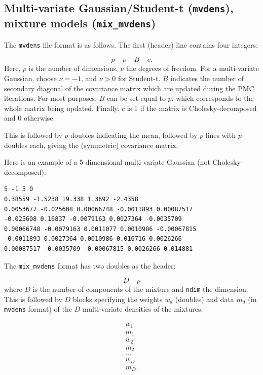\documentclass[11pt, chapterprefix, headsepline]{scrartcl}
\begin{document}
\begin{appendix}
\subsection{Multi-variate Gaussian/Student-t (\texttt{mvdens}),
  mixture models (\texttt{mix\_mvdens})}
\label{sec:mvdens}

The \texttt{mvdens} file format is as follows. The first (header) line
contains four integers:

$$
   p \;\;\;\; \nu \;\;\;\; B \;\;\;\; c.
$$
%
Here, $p$ is the number of dimensions, $\nu$ the
degrees of freedom. For a multi-variate Gaussian, choose
$\nu=-1$, and $\nu>0$ for Student-t. $B$
indicates the number of secondary diagonal of the covariance matrix
which are updated during the PMC iterations. For most purposes,
$B$ can be set equal to $p$, which
corresponds to the whole matrix being updated. Finally, $c$
is 1 if the matrix is Cholesky-decomposed and 0 otherwise.

This is followed by $p$ doubles indicating the mean,
followed by $p$ lines with $p$ doubles each,
giving the (symmetric) covariance matrix.

Here is an example of a $5$-dimensional multi-variate Gaussian (not Cholesky-decomposed):

\begin{verbatim}
5 -1 5 0
0.38559 -1.5238 19.338 1.3692 -2.4358 
0.0053677 -0.025608 0.00066748 -0.0011893 0.00087517 
-0.025608 0.16837 -0.0079163 0.0027364 -0.0035709 
0.00066748 -0.0079163 0.0011077 0.0010986 -0.00067815 
-0.0011893 0.0027364 0.0010986 0.016716 0.0026266 
0.00087517 -0.0035709 -0.00067815 0.0026266 0.014881 
\end{verbatim}

The \texttt{mix\_mvdens} format has two doubles as the header:

$$D \;\;\;\; p$$
%
where $D$ is the number of components of the mixture and
\texttt{ndim} the dimension.  This is followed by $D$
blocks specifying the weights $w_d$ (doubles) and data $m_d$ (in \texttt{mvdens} format) of
the $D$ multi-variate densities of the mixtures.

\begin{align*}
w_1 \\
m_1 \\
w_2 \\
m_2 \\
\ldots \\
w_{D} \\
m_{D} .
\end{align*}


\end{appendix}
\end{document}
